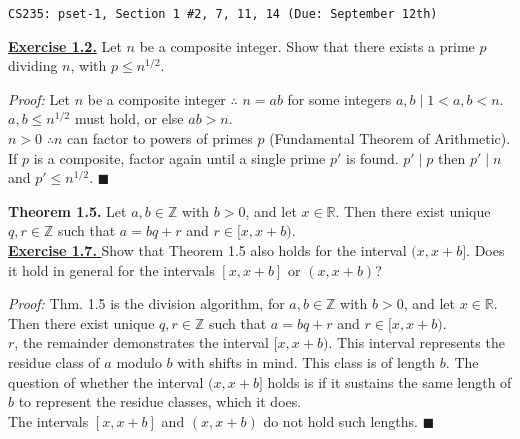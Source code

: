 \documentclass{article}
\begin{document}
\noindent
\textcolor{black!50}{\texttt{CS235: pset-1, Section 1 \#2, 7, 11, 14 (Due: September 12th)}}

\vspace{2em}
\noindent
\underline{\textbf{Exercise 1.2.}} Let \( n \) be a composite integer.
Show that there exists a prime \( p \) dividing \( n \), with \( p \leq n^{1/2} \).

\begin{greenbox}
    \textit{Proof:} Let $n$ be a composite integer $\therefore$ $n = ab$ for some integers $a, b\mid 1 < a, b < n$.\\
    $a,b \leq n^{1/2}$ must hold, or else $ab > n$.\\

    \noindent
    $n>0$ $\therefore n$ can factor to powers of primes $p$ (Fundamental Theorem of Arithmetic).
    If $p$ is a composite, factor again until a single prime $p'$ is found. $p'\mid p$ then $p' \mid n$ and $p' \leq n^{1/2}$. \hfill \(\blacksquare\)
\end{greenbox}

\noindent
\textbf{Theorem 1.5.} Let \( a, b \in \mathbb{Z} \) with \( b > 0 \), and let \( x \in \mathbb{R} \). Then there exist unique \( q, r \in \mathbb{Z} \) such that \( a = bq + r \) and \( r \in [x, x + b) \).\\

    \noindent
    \underline{\textbf{Exercise 1.7.} }Show that Theorem 1.5 also holds for the interval \( (x, x + b] \). Does it hold in general for the intervals \([x, x + b]\) or \( (x, x + b) \)?
\begin{greenbox}
    \textit{Proof:} Thm. 1.5 is the division algorithm, for \( a, b \in \mathbb{Z} \) with \( b > 0 \), and let \( x \in \mathbb{R} \). Then there exist unique \( q, r \in \mathbb{Z} \) such that \( a = bq + r \) and \( r \in [x, x + b) \).\\

    \noindent
    $r$, the remainder demonstrates the interval \([x, x + b)\).
            This interval represents the residue class of $a$ modulo $b$ with shifts in mind. This class is of length $b$.
            The question of whether the interval \((x, x + b]\) holds is if it sustains the same length of $b$ to represent the residue classes, which it does.\\

    \noindent
    The intervals \([x, x + b]\) and \((x, x + b)\) do not hold such lengths. \hfill \(\blacksquare\)
\end{greenbox}
\end{document}
